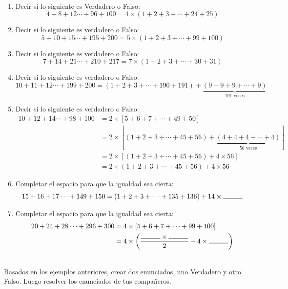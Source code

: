\begin{exer}{\ \\}
	\begin{enumerate}[label=\Alph*)]
		\item Decir si lo siguiente es Verdadero o Falso: \[	4+8+12\cdots +96+100 = 4\times (1+2+3+\cdots +24 + 25)	\]
		
		\item Decir si lo siguiente es verdadero o Falso: \[	5+10+15\cdots +195+200 = 5\times (1+2+3+\cdots +99 + 100)	\]
		
		\item Decir si lo siguiente es verdadero o Falso: \[	7+14+21\cdots +210+217 = 7\times (1+2+3+\cdots +30+ 31)	\]
		
		\item Decir si lo siguiente es verdadero o Falso: \[10+11+12\cdots +199+200 = (1+2+3+\cdots +190+191) + 	\underbrace{(9+9+9+\cdots+9)}_{\text{191 veces}} \]
		
		\item Decir si lo siguiente es verdadero o Falso:
		\begin{align*}
		10+12+14\cdots +98+100 &= 2\times \left[5+6+7+\cdots +49+50\right] \\
		&= 2\times \left[(1+2+3+ \cdots +45+56) + \underbrace{(4+4+4+\cdots+4)}_{\text{56 veces}}\right] \\
		&= 2\times \left[(1+2+3+ \cdots +45+56) +4\times 56\right]\\		
		&= 2\times (1+2+3+ \cdots +45+56 ) +4\times 56
		\end{align*}
		\item Completar el espacio para que la igualdad sea cierta: \[15+16+17\cdots +149+150 = (1+2+3+\cdots + 135+136) + 14\times \rule{10mm}{0.15mm} \]
		
		\item Completar el espacio para que la igualdad sea cierta: 
		\begin{align*}
		20+24+28\cdots +296+300 &= 4\times \left[5+6+7+\cdots +99+100\right] \\
		&= 4\times \left(\frac{ \rule{10mm}{0.15mm} \times  \rule{10mm}{0.15mm}}{2} + 4\times \rule{10mm}{0.15mm}\right)
		\end{align*}
	\end{enumerate}
\end{exer}

\begin{exer}{\ \\}
Basados en los ejemplos anteriores, crear dos enunciados, uno Verdadero y otro Falso. Luego resolver los enunciados de tus compañeros. 
\end{exer}
\newpage

